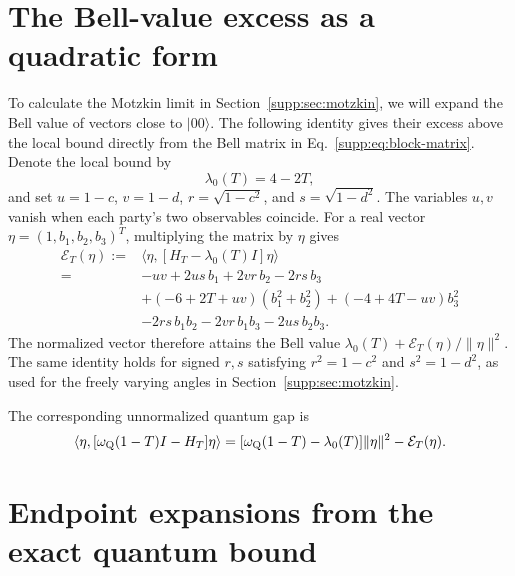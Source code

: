 \documentclass[aps,prl,onecolumn,10pt,superscriptaddress,nofootinbib,longbibliography]{revtex4-2}
\theoremstyle{remark}
\begin{document}
\section{The Bell-value excess as a quadratic form}
\label{supp:sec:cubic-scale}

To calculate the Motzkin limit in Section~\ref{supp:sec:motzkin}, we will
expand the Bell value of vectors close to $|00\rangle$. The following
identity gives their excess above the local bound directly from the Bell
matrix in Eq.~\eqref{supp:eq:block-matrix}. Denote the local bound by
\begin{equation}
\lambda_0(T)=4-2T,
\label{supp:eq:lambda-zero}
\end{equation}
and set $u=1-c$, $v=1-d$, $r=\sqrt{1-c^2}$, and $s=\sqrt{1-d^2}$. The variables $u,v$ vanish when each party's two observables coincide.
For a real vector $\eta=(1,b_1,b_2,b_3)^T$, multiplying the matrix by
$\eta$ gives
\begin{align}
\mathcal E_T(\eta)
:={}&\langle\eta,[H_T-\lambda_0(T)I]\eta\rangle
\nonumber\\
={}&-uv+2us\,b_1+2vr\,b_2-2rs\,b_3
\nonumber\\
&+(-6+2T+uv)(b_1^2+b_2^2)+(-4+4T-uv)b_3^2
\nonumber\\
&-2rs\,b_1b_2-2vr\,b_1b_3-2us\,b_2b_3.
\label{supp:eq:excess-quadratic-form}
\end{align}
The normalized vector therefore attains the Bell value
$\lambda_0(T)+\mathcal E_T(\eta)/\|\eta\|^2$.
The same identity holds for signed $r,s$ satisfying $r^2=1-c^2$ and
$s^2=1-d^2$, as used for the freely varying angles in
Section~\ref{supp:sec:motzkin}.

The corresponding unnormalized quantum gap is
\[
\langle\eta,[\omega_{\rm Q}(1-T)I-H_T]\eta\rangle
=[\omega_{\rm Q}(1-T)-\lambda_0(T)]\|\eta\|^2-\mathcal E_T(\eta).
\]

\section{Endpoint expansions from the exact quantum bound}
\label{supp:sec:endpoint}
\end{document}
